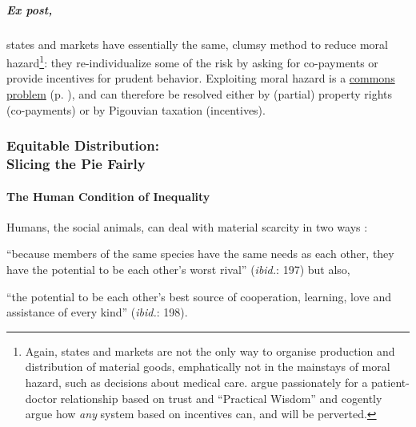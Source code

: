 \subparagraph{Ex post,} states and markets have essentially the same, clumsy method to reduce moral hazard\footnote{
	Again, states and markets are not the only way to organise production and distribution of material goods, emphatically not in the mainstays of moral hazard, such as decisions about medical care. \cite{Schwartz2010} argue passionately for a patient-doctor relationship based on trust and ``Practical Wisdom'' and cogently argue how \emph{any} system based on incentives can, and will be perverted.}: 
they re-individualize some of the risk by asking for co-payments or provide incentives for prudent behavior. Exploiting moral hazard is a \hyperref[sec:commongood]{commons problem} (p. \pageref{sec:commongood}), and can therefore be resolved either by (partial) property rights (co-payments) or by Pigouvian taxation (incentives).

\subsubsection[Equitable Distribution]{Equitable Distribution: \\Slicing the Pie Fairly} \label{sec:distribution}


\paragraph{The Human Condition of Inequality}  \label{sec:humanconditionofinequality} Humans, the social animals, can deal with material scarcity in two ways \citep{Pickett-2009-kx}: \begin{inparaenum}[1)]
	\item ``because members of the same species have the same needs as each other, they have the potential to be each other's worst rival'' (\emph{ibid.}: 197) but also,
	\item ``the potential to be each other's best source of cooperation, learning, love and assistance of every kind'' (\emph{ibid.}: 198). \end{inparaenum}

